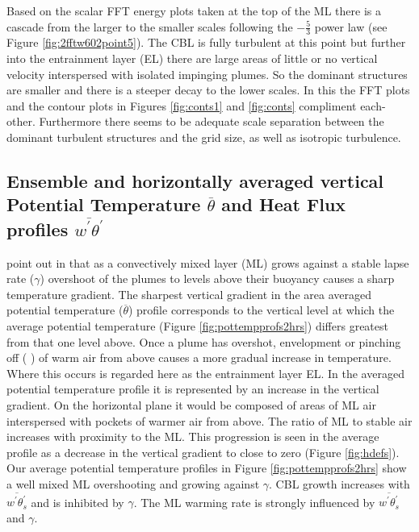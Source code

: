 Based on the scalar \acs{FFT} energy plots taken at the top of the \acs{ML} there is a cascade from the larger
to the smaller scales following the $-\frac{5}{3}$ power law (see Figure \ref{fig:2fftw602point5}). The \acs{CBL} is fully turbulent at this point
but further into the entrainment layer (\acs{EL}) there are large areas of little or no vertical velocity
interspersed with isolated impinging plumes.  So the dominant structures are smaller
and there is a steeper decay to the lower scales.  In this the \acs{FFT} plots and the contour plots in Figures \ref{fig:conts1} and \ref{fig:conts} compliment
each-other.  Furthermore there seems to be adequate scale separation between the dominant turbulent structures and the grid size, as well as isotropic turbulence.


\subsection{Ensemble and horizontally averaged vertical Potential Temperature $\overline{\theta}$ 
and Heat Flux profiles $\overline{w^{'}\theta^{'}}$}
\FloatBarrier

\citeauthor{SchmidtSchu} point out in \cite{SchmidtSchu} that as a convectively mixed layer (\acs{ML})
grows against a stable lapse rate ($\gamma$) overshoot of the plumes to levels above their buoyancy causes
a sharp temperature gradient.  The sharpest vertical gradient in the area averaged potential temperature ($\overline{\theta}$)
profile corresponds to the vertical level at which the average potential temperature (Figure \ref{fig:pottempprofs2hrs}) differs greatest from that one level above.  Once a plume has overshot, envelopment or pinching off (\citeauthor{SullMoengStev} 
\cite{SullMoengStev}) of warm air from above causes a more gradual increase in temperature.  
Where this occurs is regarded here as the entrainment layer \acs{EL}.  In the averaged potential temperature 
profile it is represented by an increase in the vertical gradient. On the horizontal plane it would be composed 
of areas of \acs{ML} air interspersed with pockets of warmer air from above.  The ratio of \acs{ML} to stable air 
increases with proximity to the \acs{ML}.  This progression is seen in the average profile as a decrease in the
vertical gradient to close to zero (Figure \ref{fig:hdefs}).  Our average potential temperature profiles in Figure \ref{fig:pottempprofs2hrs} show a well mixed \acs{ML} overshooting
and growing against $\gamma$.  \acs{CBL} growth increases with $\overline{w^{'}\theta^{'}_{s}}$ and is inhibited 
by $\gamma$.  The \acs{ML} warming rate is strongly influenced by $\overline{w^{'}\theta^{'}_{s}}$ and $\gamma$.\\

